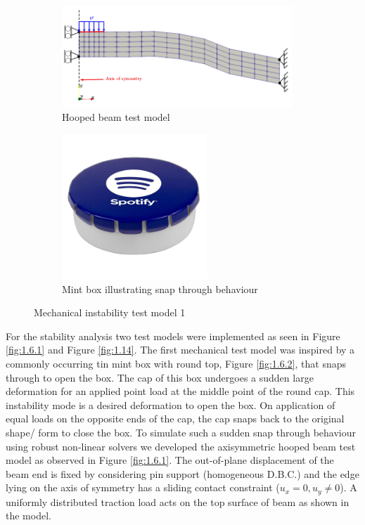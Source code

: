 \documentclass[11pt,a4paper,final]{article}
\begin{document}
\begin{figure}[ht!]
\centering
\begin{subfigure}[b]{0.6\textwidth}
\centering
\includegraphics[width=0.95\textwidth]{hooped_beam_grid.png}
\caption{Hooped beam test model}
\label{fig:1.6.1}
\end{subfigure}
\begin{subfigure}[b]{0.39\textwidth}
\centering
\includegraphics[width=0.6\textwidth]{snap_top_mint_box.jpg}
\caption{Mint box illustrating snap through behaviour}
\label{fig:1.6.2}
\end{subfigure}
\caption{Mechanical instability test model 1}
\label{fig:1.6}
\end{figure}

For the stability analysis two test models were implemented as seen in Figure \eqref{fig:1.6.1} and Figure \eqref{fig:1.14}. The first mechanical test model was inspired by a commonly occurring tin mint box with round top, Figure \eqref{fig:1.6.2}, that snaps through to open the box. The cap of this box undergoes a sudden large deformation for an applied point load at the middle point of the round cap. This instability mode is a desired deformation to open the box. On application of equal loads on the opposite ends of the cap, the cap snaps back to the original shape/ form to close the box. To simulate such a sudden snap through behaviour using robust non-linear solvers we developed the axisymmetric hooped beam test model as observed in Figure \eqref{fig:1.6.1}. The out-of-plane displacement of the beam end is fixed by considering pin support (homogeneous D.B.C.) and the edge lying on the axis of symmetry has a sliding contact constraint ($u_x = 0, u_y \neq 0$). A uniformly distributed traction load acts on the top surface of beam as shown in the model. \par 
\end{document}
